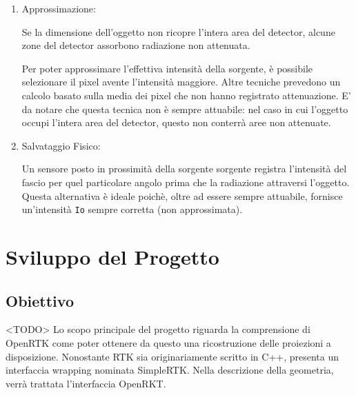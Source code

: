 \documentclass[a4paper,12pt, doubleside]{report}
\begin{document}
                    \begin{enumerate}
                        \item Approssimazione:
                            \par
                                Se la dimensione dell'oggetto non ricopre l'intera area del detector, alcune zone del detector assorbono radiazione non attenuata.
                                
                                Per poter approssimare l'effettiva intensità della sorgente, è possibile selezionare il pixel avente l'intensità maggiore. Altre tecniche prevedono un calcolo basato sulla media dei pixel che non hanno registrato attenuazione.
                                E' da notare che questa tecnica non è sempre attuabile: nel caso in cui l'oggetto occupi l'intera area del detector, questo non conterrà aree non attenuate.
                        
                        \item Salvataggio Fisico:
                            \par
                                Un sensore posto in prossimità della sorgente sorgente registra l'intensità del fascio per quel particolare angolo prima che la radiazione attraversi l'oggetto. Questa alternativa è ideale poichè, oltre ad essere sempre attuabile, fornisce un'intensità \texttt{Io} sempre corretta (non approssimata).
                    \end{enumerate}                
                
                   
                    
                    
                                  
    \chapter{Sviluppo del Progetto}
        \section{Obiettivo}
            <TODO>
            Lo scopo principale del progetto riguarda la comprensione di OpenRTK come poter ottenere da questo una ricostruzione delle proiezioni a disposizione.
            Nonostante RTK sia originariamente scritto in C++, presenta un interfaccia wrapping nominata SimpleRTK. Nella descrizione della geometria, verrà trattata l'interfaccia OpenRKT.
         
\end{document}
